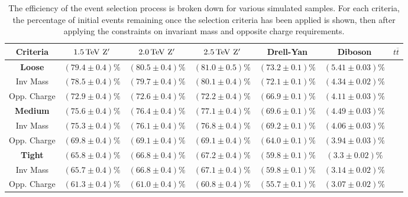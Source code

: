 \documentclass{article}
\begin{document}
\begin{table}[h!t]
\caption{The efficiency of the event selection process is broken down for various simulated samples. For each criteria, the percentage of initial events remaining once the selection criteria has been applied is shown, then after applying the constraints on invariant mass and opposite charge requirements. \label{table:selectionEfficiency}}
\begin{tabular}{|c|c|c|c|c|c|c| } 
\hline
Criteria & $1.5\,\rm{TeV}\,\,Z'$ & $2.0\,\rm{TeV}\,\,Z'$ & $2.5\,\rm{TeV}\,\,Z'$ & Drell-Yan & Diboson & $t\overline{t}$ \\
\hline
\bf{Loose} & $(79.4\pm0.4)\%$ & $(80.5\pm0.4)\%$ & $(81.0\pm0.5)\%$ & $(73.2\pm0.1)\%$ & $(5.41\pm0.03)\%$ & \\
Inv Mass & $(78.5\pm0.4)\%$ & $(79.7\pm0.4)\%$ & $(80.1\pm0.4)\%$ & $(72.1\pm0.1)\%$ & $(4.34\pm0.02)\%$ & \\
Opp. Charge & $(72.9\pm0.4)\%$ & $(72.6\pm0.4)\%$ & $(72.2\pm0.4)\%$ & $(66.9\pm0.1)\%$ & $(4.11\pm0.03)\%$ & \\
\hline
\bf{Medium} & $(75.6\pm0.4)\%$ & $(76.4\pm0.4)\%$ & $(77.1\pm0.4)\%$ & $(69.6\pm0.1)\%$ & $(4.49\pm0.03)\%$ & \\
Inv Mass & $(75.3\pm0.4)\%$ & $(76.1\pm0.4)\%$ & $(76.8\pm0.4)\%$ & $(69.2\pm0.1)\%$ & $(4.06\pm0.03)\%$ & \\
Opp. Charge & $(69.8\pm0.4)\%$ & $(69.1\pm0.4)\%$ & $(69.1\pm0.4)\%$ & $(64.0\pm0.1)\%$ & $(3.94\pm0.03)\%$ & \\
\hline
\bf{Tight} & $(65.8\pm0.4)\%$ & $(66.8\pm0.4)\%$ & $(67.2\pm0.4)\%$ & $(59.8\pm0.1)\%$ & $(3.3\pm0.02)\%$ & \\
Inv Mass & $(65.7\pm0.4)\%$ & $(66.8\pm0.4)\%$ & $(67.1\pm0.4)\%$ & $(59.8\pm0.1)\%$ & $(3.14\pm0.02)\%$ & \\
Opp. Charge & $(61.3\pm0.4)\%$ & $(61.0\pm0.4)\%$ & $(60.8\pm0.4)\%$ & $(55.7\pm0.1)\%$ & $(3.07\pm0.02)\%$ & \\
\hline
\end{tabular}
\end{table}
\end{document}
